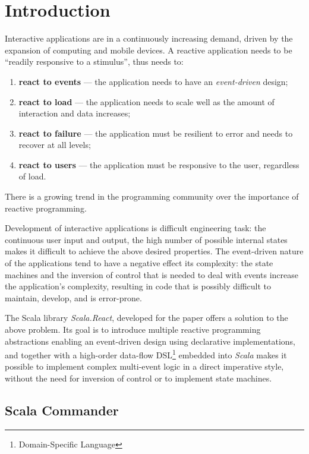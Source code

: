 
\chapter{Introduction}\label{chap:intro}


Interactive applications are in a continuously increasing demand, driven by the expansion of computing and mobile devices. A reactive application needs to be ``readily responsive to a stimulus'', thus needs to:
\begin{enumerate}
\item \textbf{react to events} --- the application needs to have an \emph{event-driven} design;
\item \textbf{react to load} --- the application needs to scale well as the amount of interaction and data increases;
\item \textbf{react to failure} --- the application must be resilient to error and needs to recover at all levels;
\item \textbf{react to users} --- the application must be responsive to the user, regardless of load.
\end{enumerate}
There is a growing trend in the programming community over the importance of reactive programming. \cite{ReactiveManifesto}

Development of interactive applications is difficult engineering task: the continuous user input and output, the high number of possible internal states makes it difficult to achieve the above desired properties. The event-driven nature of the applications tend to have a negative effect its complexity: the state machines and the inversion of control that is needed to deal with events increase the application's complexity, resulting in code that is possibly difficult to maintain, develop, and is error-prone. 

The Scala library \emph{Scala.React}, developed for the paper \cite{EPFL-REPORT-176887} offers a solution to the above problem. Its goal is to introduce multiple reactive programming abstractions enabling an event-driven design using declarative implementations, and together with a high-order data-flow DSL\footnote{Domain-Specific Language} embedded into \emph{Scala} makes it possible to implement complex multi-event logic in a direct imperative style, without the need for inversion of control or to implement state machines. 

\section{Scala Commander}

